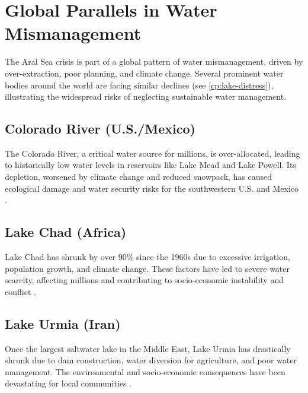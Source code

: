 

\chapter[Global Parallels in Water Mismanagement]{Global Parallels in Water Mismanagement}
\label{cp:global-parallels}
\vspace{.935em}

The Aral Sea crisis is part of a global pattern of water mismanagement, driven by over-extraction, poor planning, and climate change. Several prominent water bodies around the world are facing similar declines (see \autoref{cp:lake-distress}), illustrating the widespread risks of neglecting sustainable water management.

\section{Colorado River (U.S./Mexico)}
The Colorado River, a critical water source for millions, is over-allocated, leading to historically low water levels in reservoirs like Lake Mead and Lake Powell. Its depletion,
worsened by climate change and reduced snowpack, has caused ecological damage and water security risks for the southwestern U.S. and Mexico \autocite{udall2017colorado}.

\section{Lake Chad (Africa)}
Lake Chad has shrunk by over 90\% since the 1960s due to excessive irrigation, population growth, and climate change. These factors have led to severe water scarcity, affecting millions and contributing to socio-economic instability and conflict \autocite{unep2025tale}\autocite{okpara2016lake}.

\section{Lake Urmia (Iran)}
Once the largest saltwater lake in the Middle East, Lake Urmia has drastically shrunk due to dam construction, water diversion for agriculture, and poor water management. The environmental and socio-economic consequences have been devastating for local
communities \autocite{mahoozi2024urmia}.

